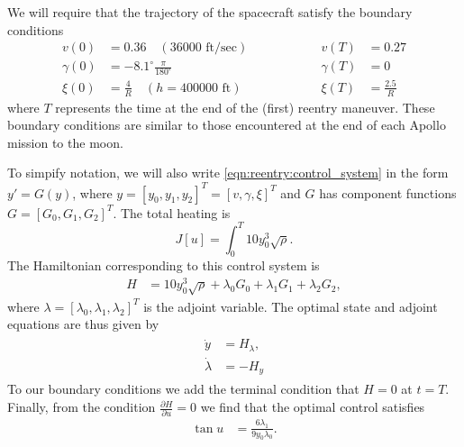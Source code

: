 We will require that the trajectory of the spacecraft satisfy the boundary conditions
\begin{equation}
  \begin{split}
    v(0) &= 0.36 \quad (36000 \text{ ft/sec})\\
    \gamma(0) &= -8.1^\circ \frac{\pi}{180^\circ}\\
    \xi(0)&= \frac{4}{R}\quad (h = 400000 \text{ ft})
  \end{split} 
\quad \quad \quad \quad \quad
  \begin{split}
    v(T) &= 0.27\\
    \gamma(T) &= 0 \\
	\xi(T)&= \frac{2.5}{R}
  \end{split} \label{eqn:reentry:BCs}
\end{equation}
where $T$ represents the time at the end of the (first) reentry maneuver. 
These boundary conditions are similar to those encountered at the end of each Apollo mission to the moon. 


To simpify notation, we will also write \eqref{eqn:reentry:control_system} in the form $y' = G(y)$, where $y = [y_0, y_1, y_2]^T=[v,\gamma, \xi]^T$ and $G$ has component functions $G = [G_0, G_1, G_2]^T$. 
%
The total heating is 
\[
J[u] = \int_0^T 10y_0^3 \sqrt{\rho}.
\]
The Hamiltonian corresponding to this control system is 
\begin{align}
H &=  10y_0^3 \sqrt{\rho} + \lambda_0G_0 + \lambda_1G_1 + \lambda_2G_2,
\end{align}
where $\lambda = [\lambda_0,\lambda_1,\lambda_2]^T$ is the adjoint variable. 
The optimal state and adjoint equations are thus given by 
\begin{align}
\begin{split}
	\dot{y} &= H_{\lambda},\\
	\dot{\lambda} &= -H_{y} \label{eqn:reentry:full_system}
\end{split}
\end{align}
To our boundary conditions we add the terminal condition that $H = 0$ at $t = T$. 
Finally, from the condition $\frac{\partial H}{\partial u} = 0$ we find that the optimal control satisfies 
\begin{align}
\tan u &= \frac{6\lambda_1}{9y_0\lambda_0}.
\end{align}

